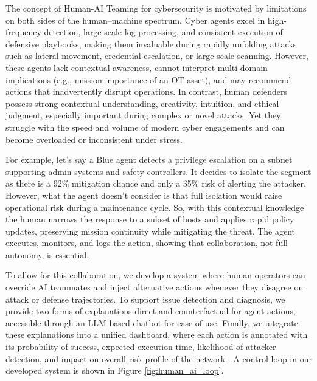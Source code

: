 The concept of Human-AI Teaming for cybersecurity is motivated by limitations on both sides of the human–machine spectrum. Cyber agents excel in high-frequency detection, large-scale log processing, and consistent execution of defensive playbooks, making them invaluable during rapidly unfolding attacks such as lateral movement, credential escalation, or large-scale scanning. However, these agents lack contextual awareness, cannot interpret multi-domain implications (e.g., mission importance of an OT asset), and may recommend actions that inadvertently disrupt operations.
In contrast, human defenders possess strong contextual understanding, creativity, intuition, and ethical judgment, especially important during complex or novel attacks. Yet they struggle with the speed and volume of modern cyber engagements and can become overloaded or inconsistent under stress.

For example, let's say a Blue agent detects a privilege escalation on a subnet supporting admin systems and safety controllers. 
It decides to isolate the segment as there is a  92\% mitigation chance and only a 35\% risk of alerting the attacker. 
However, what the agent doesn't consider is that full isolation would raise operational risk during a maintenance cycle. 
So, with this contextual knowledge the human narrows the response to a subset of hosts and applies rapid policy updates, preserving mission continuity while mitigating the threat. 
The agent executes, monitors, and logs the action, showing that collaboration, not full autonomy, is essential.

To allow for this collaboration, we develop a system where human operators can override AI teammates and inject alternative actions whenever they disagree on attack or defense trajectories. 
To support issue detection and diagnosis, we provide two forms of explanations-direct and counterfactual-for agent actions, accessible through an LLM-based chatbot for ease of use. 
Finally, we integrate these explanations into a unified dashboard, where each action is annotated with its probability of success, expected execution time, likelihood of attacker detection, and impact on overall risk profile of the network \cite{neema2021model}.
A control loop in our developed system is shown in Figure \ref{fig:human_ai_loop}.

